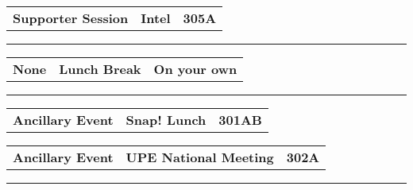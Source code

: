 \begin{longtable}[l]{@{}p{1in}@{}p{3in}@{}r}
    {\sffamily\large\textbf{Supporter Session}} & 
    {\sffamily\large\textbf{Intel}} & 
    {\sffamily\large\textbf{305A}} \\
\end{longtable}    
\vspace{0.5em}
\noindent\rule{5in}{0.02cm}
\vspace{0.5em}
\noindent
{}
\begin{longtable}[l]{@{}p{1in}@{}p{3in}@{}r}
    {\sffamily\large\textbf{None}} & 
    {\sffamily\large\textbf{Lunch Break}} & 
    {\sffamily\large\textbf{On your own}} \\
\end{longtable}    
\vspace{0.5em}
\noindent\rule{5in}{0.02cm}
\vspace{0.5em}
\noindent
{}
\begin{longtable}[l]{@{}p{1in}@{}p{3in}@{}r}
    {\sffamily\large\textbf{Ancillary Event}} & 
    {\sffamily\large\textbf{Snap! Lunch}} & 
    {\sffamily\large\textbf{301AB}} \\
\end{longtable}    
\begin{longtable}[l]{@{}p{1in}@{}p{3in}@{}r}
    {\sffamily\large\textbf{Ancillary Event}} & 
    {\sffamily\large\textbf{UPE National Meeting}} & 
    {\sffamily\large\textbf{302A}} \\
\end{longtable}    
\vspace{0.5em}
\noindent\rule{5in}{0.02cm}
\vspace{0.5em}
\noindent
{}
